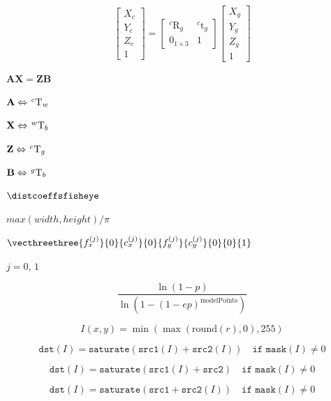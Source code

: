 \documentclass{article}
\begin{document}
\[    \begin{bmatrix}
    X_c\\
    Y_c\\
    Z_c\\
    1
    \end{bmatrix}
    =
    \begin{bmatrix}
    _{}^{c}\textrm{R}_g & _{}^{c}\textrm{t}_g \\
    0_{1 \times 3} & 1
    \end{bmatrix}
    \begin{bmatrix}
    X_g\\
    Y_g\\
    Z_g\\
    1
    \end{bmatrix}
\]
\pagebreak

$\mathbf{A}\mathbf{X}=\mathbf{Z}\mathbf{B}$
\pagebreak

$\mathbf{A} \Leftrightarrow \hspace{0.1em} _{}^{c}\textrm{T}_w$
\pagebreak

$\mathbf{X} \Leftrightarrow \hspace{0.1em} _{}^{w}\textrm{T}_b$
\pagebreak

$\mathbf{Z} \Leftrightarrow \hspace{0.1em} _{}^{c}\textrm{T}_g$
\pagebreak

$\mathbf{B} \Leftrightarrow \hspace{0.1em} _{}^{g}\textrm{T}_b$
\pagebreak

$\distcoeffsfisheye$
\pagebreak

$max(width,height)/\pi$
\pagebreak

$\vecthreethree{f_x^{(j)}}{0}{c_x^{(j)}}{0}{f_y^{(j)}}{c_y^{(j)}}{0}{0}{1}$
\pagebreak

$j = 0,\, 1$
\pagebreak

\[\frac{\ln(1-p)}{\ln\left(1-(1-ep)^\mathrm{modelPoints}\right)}
\]
\pagebreak

\[I(x,y)= \min ( \max (\textrm{round}(r), 0), 255)\]
\pagebreak

\[\texttt{dst}(I) =  \texttt{saturate} ( \texttt{src1}(I) +  \texttt{src2}(I)) \quad \texttt{if mask}(I) \ne0\]
\pagebreak

\[\texttt{dst}(I) =  \texttt{saturate} ( \texttt{src1}(I) +  \texttt{src2} ) \quad \texttt{if mask}(I) \ne0\]
\pagebreak

\[\texttt{dst}(I) =  \texttt{saturate} ( \texttt{src1} +  \texttt{src2}(I) ) \quad \texttt{if mask}(I) \ne0\]
\pagebreak
\end{document}
